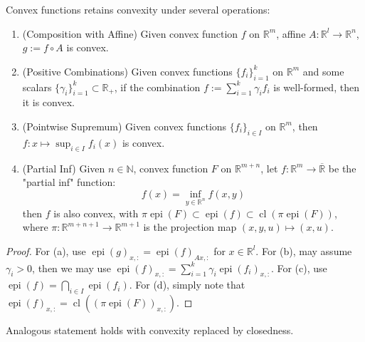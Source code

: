 \begin{prop}\label{prop:021-yoga-convex-functions}
	Convex functions retains convexity under several operations:
	\begin{enumerate}[label=(\alph*)]
		\item (Composition with Affine) Given convex function $f$ on $\mathbb{R}^m$, affine $A:\mathbb{R}^l\to \mathbb{R}^n$, $g:=f\circ A$ is convex.
		\item (Positive Combinations) Given convex functions $\{f_i\}_{i=1}^k$ on $\mathbb{R}^m$ and some scalars $\{\gamma_i\}_{i=1}^k\subset \mathbb{R}_{+}$, if the combination $f:=\sum_{i=1}^k \gamma_i f_i$ is well-formed, then it is convex.
		\item (Pointwise Supremum) Given convex functions $\{f_i\}_{i\in I}$ on $\mathbb{R}^m$, then $f:x\mapsto\sup_{i\in I}f_i(x)$ is convex.
		\item (Partial Inf) Given $n\in \mathbb{N}$, convex function $F$ on $\mathbb{R}^{m+n}$, let $f:\mathbb{R}^m\to \overline{\mathbb{R}}$ be the "partial inf" function:
		      \[
			      f(x)=\underset{y\in \mathbb{R}^n}{\operatorname{inf}}f(x,y)
		      \]
		      then $f$ is also convex, with $\pi \operatorname{epi}(F)\subset \operatorname{epi}(f)\subset \operatorname{cl}(\pi \operatorname{epi}(F))$, where $\pi:\mathbb{R}^{m+n+1}\to \mathbb{R}^{m+1}$ is the projection map $(x,y,u)\mapsto (x,u)$.
	\end{enumerate}
\end{prop}

\begin{proof}
	For (a), use $\operatorname{epi}(g)_{x,:}=\operatorname{epi}(f)_{Ax,:}$ for $x\in \mathbb{R}^l$. For (b), may assume $ \gamma_i>0$, then we may use $\operatorname{epi}(f)_{x,:}=\sum_{i=1}^k\gamma_i\operatorname{epi}(f_i)_{x,:}$.	For (c), use $\operatorname{epi}(f)=\bigcap_{i\in I}\operatorname{epi}(f_i)$. For (d), simply note that $\operatorname{epi}(f)_{x,:}=\operatorname{cl}((\pi\operatorname{epi}(F))_{x,:})$.
\end{proof}

\begin{rmrk}
	Analogous statement holds with convexity replaced by closedness.
\end{rmrk}

